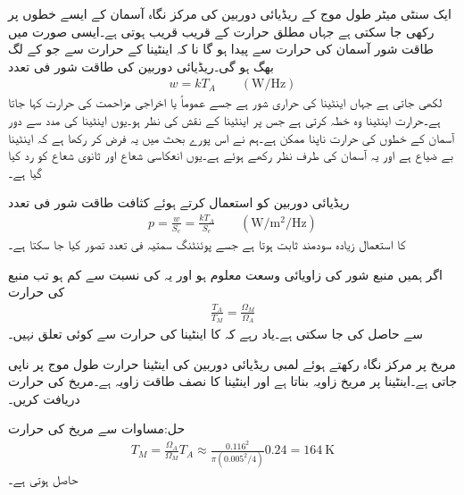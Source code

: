 ایک سنٹی میٹر طول موج کے ریڈیائی دوربین کی مرکز نگاہ  آسمان کے ایسے خطوں پر رکھی جا سکتی ہے جہاں مطلق حرارت  کے قریب قریب ہوتی ہے۔ایسی صورت میں طاقت شور آسمان کی حرارت سے پیدا ہو گا نا کہ اینٹینا کے حرارت سے جو  کے لگ بھگ  ہو گی۔ریڈیائی دوربین کی طاقت شور فی تعدد
\begin{align}
w=k T_A  \quad \quad (\si{\watt \per \hertz})
\end{align}
لکھی جاتی ہے جہاں  اینٹینا کی حراری شور ہے جسے عموماً  یا اخراجی مزاحمت کی حرارت کہا جاتا ہے۔حرارت اینٹینا وہ خطہ کرتی ہے جس پر اینٹینا کے نقش کی نظر ہو۔یوں اینٹینا کی مدد سے دور آسمان  کے خطوں کی حرارت ناپنا ممکن ہے۔ہم نے اس پورے بحث میں یہ فرض کر رکھا ہے کہ اینٹینا بے ضیاع ہے اور یہ آسمان کی طرف نظر رکھے ہوئے ہے۔یوں انعکاسی شعاع اور ثانوی شعاع کو رد کیا گیا ہے۔

ریڈیائی دوربین کو استعمال کرتے ہوئے  کثافت طاقت شور فی تعدد
\begin{align}
p=\frac{w}{S_e}=\frac{k T_A}{S_e} \quad \quad (\si{\watt \per \meter \squared \per\hertz})
\end{align} 
کا استعمال زیادہ سودمند ثابت ہوتا ہے جسے پوئنٹنگ سمتیہ فی تعدد تصور کیا جا سکتا ہے۔ 

اگر ہمیں منبع شور کی زاویائی وسعت  معلوم ہو اور یہ  کی نسبت سے کم ہو تب منبع کی حرارت
\begin{align}\label{مساوات_اینٹینا_ریڈیائی_حرارت}
\frac{T_A}{T_M}=\frac{\Omega_M}{\Omega_A}
\end{align}
سے حاصل کی جا سکتی ہے۔یاد رہے کہ  کا اینٹینا کی حرارت سے کوئی تعلق نہیں۔

مریخ پر مرکز نگاہ رکھتے ہوئے  لمبی ریڈیائی دوربین کی اینٹینا حرارت  طول موج پر  ناپی جاتی ہے۔اینٹینا پر مریخ  زاویہ بناتا ہے اور اینٹینا کا نصف طاقت زاویہ  ہے۔مریخ کی حرارت دریافت کریں۔

حل:مساوات  سے مریخ کی حرارت
\begin{align*}
T_M=\frac{\Omega_A}{\Omega_M}T_A \approx \frac{0.116^2}{\pi (0.005^2\!/\!4)} 0.24=\SI{164}{\kelvin}
\end{align*}
حاصل ہوتی ہے۔

